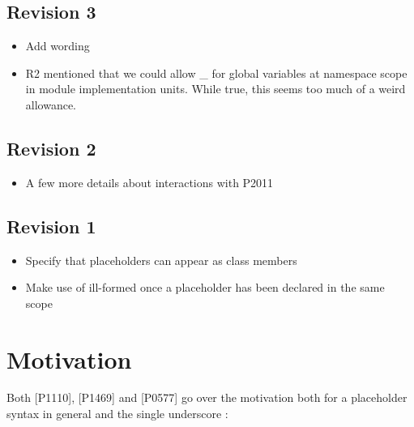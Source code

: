 \documentclass{wg21}
\begin{document}
\subsection{Revision 3}

\begin{itemize}
\item Add wording
\item R2 mentioned that we could allow _ for global variables at namespace scope in module implementation units. While true, this seems too much of a weird allowance.
\end{itemize}

\subsection{Revision 2}

\begin{itemize}
    \item A few more details about interactions with P2011
\end{itemize}

\subsection{Revision 1}

\begin{itemize}
   \item Specify that placeholders can appear as class members
   \item Make use of \tcode{_} ill-formed once a placeholder has been declared in the same scope
\end{itemize}

\section{Motivation}

Both [P1110]\cite{P1110R0}, [P1469]\cite{P1469R0} and [P0577]\cite{P0577R0} go over the motivation both for a placeholder syntax in general and
the single underscore \tcode{_}:
\end{document}
